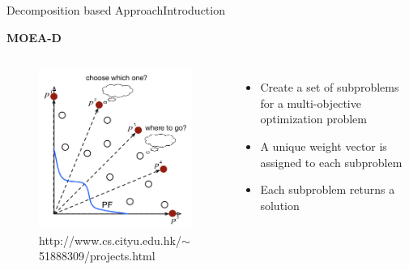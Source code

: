 \begin{frame}{Decomposition based Approach}{Introduction}

{\bf MOEA-D}

\begin{columns}
\begin{figure}
	\centering
	\includegraphics[width=\linewidth]{figure/MOEA-D}
	\caption{\tiny http://www.cs.cityu.edu.hk/$\sim$51888309/projects.html}
\end{figure}
\begin{itemize}
\item Create a set of subproblems for a multi-objective optimization problem
\item A unique weight vector is assigned to each subproblem
\item Each subproblem returns a solution 
\end{itemize}
\end{columns}

\end{frame}


